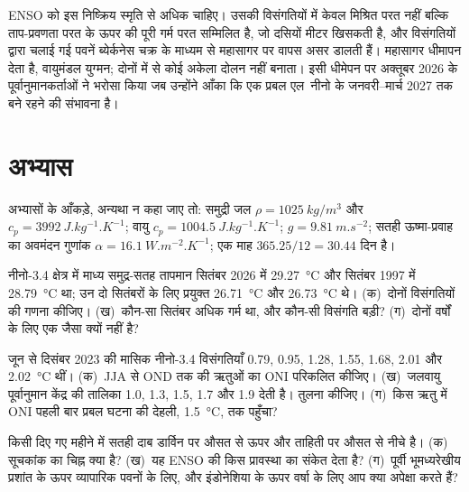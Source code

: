 ENSO को इस निष्क्रिय स्मृति से अधिक चाहिए। उसकी विसंगतियों में केवल मिश्रित परत नहीं बल्कि
ताप-प्रवणता परत के ऊपर की पूरी गर्म परत सम्मिलित है, जो दसियों मीटर खिसकती है, और विसंगतियों द्वारा चलाई गई
पवनें ब्येर्कनेस चक्र के माध्यम से महासागर पर वापस असर डालती हैं। महासागर धीमापन देता है,
वायुमंडल युग्मन; दोनों में से कोई अकेला दोलन नहीं बनाता। इसी धीमेपन पर अक्तूबर 2026 के
पूर्वानुमानकर्ताओं ने भरोसा किया जब उन्होंने आँका कि एक प्रबल एल~नीनो के
जनवरी--मार्च 2027 तक बने रहने की संभावना है।

\section*{अभ्यास}\label{sec:b2:climate-variability:exercises}

अभ्यासों के आँकड़े, अन्यथा न कहा जाए तो: समुद्री जल $\rho = \qty{1025}{kg/m^3}$ और $c_p =
\qty{3992}{J.kg^{-1}.K^{-1}}$; वायु $c_p = \qty{1004.5}{J.kg^{-1}.K^{-1}}$; $g =
\qty{9.81}{m.s^{-2}}$; सतही ऊष्मा-प्रवाह का अवमंदन गुणांक $\alpha =
\qty{16.1}{W.m^{-2}.K^{-1}}$; एक माह $365.25/12 = 30.44$ दिन है।

\begin{exercise}[$\star$]\label{exo:b2:climate-variability:1}
नीनो-3.4 क्षेत्र में माध्य समुद्र-सतह तापमान सितंबर 2026 में \qty{29.27}{\celsius} और सितंबर 1997 में
\qty{28.79}{\celsius} था; उन दो सितंबरों के लिए प्रयुक्त 
\qty{26.71}{\celsius} और \qty{26.73}{\celsius} थे। (क)~दोनों विसंगतियों की गणना कीजिए। (ख)~कौन-सा
सितंबर अधिक गर्म था, और कौन-सी विसंगति बड़ी? (ग)~दोनों वर्षों के लिए 
एक जैसा क्यों नहीं है?
\end{exercise}

\begin{exercise}[$\star$]\label{exo:b2:climate-variability:2}
जून से दिसंबर 2023 की मासिक नीनो-3.4 विसंगतियाँ 0.79, 0.95, 1.28, 1.55, 1.68, 2.01
और \qty{2.02}{\celsius} थीं। (क)~JJA से OND तक की ऋतुओं का ONI परिकलित कीजिए। (ख)~जलवायु
पूर्वानुमान केंद्र की तालिका 1.0, 1.3, 1.5, 1.7 और 1.9 देती है। तुलना कीजिए। (ग)~किस ऋतु में
ONI पहली बार प्रबल घटना की देहली, \qty{1.5}{\celsius}, तक पहुँचा?
\end{exercise}

\begin{exercise}[$\star$]\label{exo:b2:climate-variability:3}
किसी दिए गए महीने में सतही दाब डार्विन पर औसत से ऊपर और ताहिती पर औसत से नीचे है।
(क)~ सूचकांक का चिह्न क्या है? (ख)~यह ENSO की किस प्रावस्था का संकेत देता है?
(ग)~पूर्वी भूमध्यरेखीय प्रशांत के ऊपर व्यापारिक पवनों के लिए, और इंडोनेशिया के ऊपर
वर्षा के लिए आप क्या अपेक्षा करते हैं?
\end{exercise}

